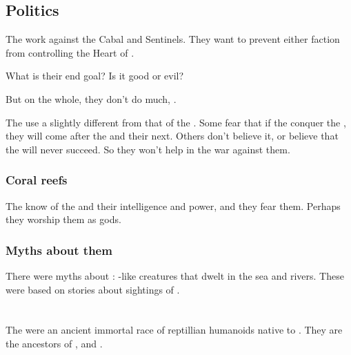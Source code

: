 \subsection{Politics}
The \nagae{} work against the Cabal and Sentinels. They want to prevent either faction from controlling the Heart of \Miith{}. 

What is their end goal? Is it good or evil? 

But on the whole, they don't do much, . 

The \nagae{} use a \dweomer{} slightly different from that of the \dragons. 
Some fear that if the \banes{} conquer the \dragons, they will come after the \nagae{} and their \dweomer{} next. 
Others don't believe it, or believe that the \banes{} will never succeed. 
So they won't help in the war against them. 





\subsubsection{Coral reefs}
The \nagae{} know of the  and their intelligence and power, and they fear them. 
Perhaps they worship them as gods. 





\subsubsection{Myths about them}
There were myths about : 
\Scatha-like creatures that dwelt in the sea and rivers. 
These were based on stories about sightings of \nagae. 

















\section{\Ophidians}
\index{\ophidian}
The \ophidians{} were an ancient immortal race of reptillian humanoids native to \Miith. 
They are the ancestors of \dragons, \quiljaaran{} and \nagae. 

